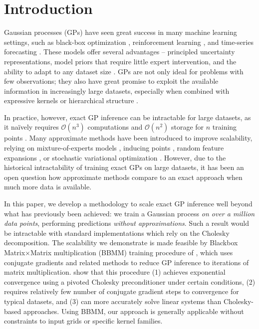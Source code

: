 \section{Introduction}
Gaussian processes (GPs) have seen great success in many machine learning settings, such as black-box optimization \citep{snoek2012practical}, reinforcement learning \cite{deisenroth2011pilco,deisenroth2015gaussian}, and time-series forecasting \cite{roberts2013gaussian}.
These models offer several advantages -- principled uncertainty representations, model priors that require little expert intervention, and the ability to adapt to any dataset size \citep{rasmussen2001occam,rasmussen2006gaussian}.
GPs are not only ideal for problems with few observations; they also have great
promise to exploit the available information in increasingly large datasets,
especially when combined with expressive kernels \cite{wilson2013gaussian} or
hierarchical structure \cite{wilson2012gaussian, damianou2013deep,wilson2016deep,salimbeni2017doubly}.

In practice, however, exact GP inference can be intractable for large datasets, as it na\"ively requires $\mathcal{O}(n^3)$ computations and $\mathcal{O}(n^2)$ storage for $n$ training points \cite{rasmussen2006gaussian}.
Many approximate methods have been introduced to improve scalability, relying on mixture-of-experts models \cite{deisenroth2015distributed}, inducing points \citep{snelson2006sparse,titsias2009variational,wilson2015kernel,gardner2018product},
random feature expansions \cite{rahimi2008random,le2013fastfood,yang2015carte},
or stochastic variational optimization \citep{hensman2013gaussian,hensman2015scalable,wilson2016stochastic,cheng2017variational,salimbeni2018orthogonally}.
However, due to the historical intractability of training exact GPs on large datasets, it
has been an open question how approximate methods compare to an exact approach when much more data is available.

In this paper, we develop a methodology to scale exact GP inference well beyond what has previously been achieved:
we train a Gaussian process \emph{on over a million data points}, performing predictions \emph{without approximations}.
Such a result would be intractable with standard implementations which rely on the Cholesky decomposition.
The scalability we demonstrate is made feasible by Blackbox Matrix$\times$Matrix multiplication (BBMM) training procedure of \citet{gardner2018gpytorch}, which uses conjugate gradients and related methods to reduce GP inference to iterations of matrix multiplication.
\citet{gardner2018gpytorch} show that this procedure (1) achieves exponential convergence using a pivoted Cholesky preconditioner under certain conditions, (2) requires relatively few number of conjugate gradient steps to convergence for typical datasets, and (3) can more accurately solve linear systems than Cholesky-based approaches. Using BBMM, our approach is generally applicable without constraints to input grids or specific kernel families.

